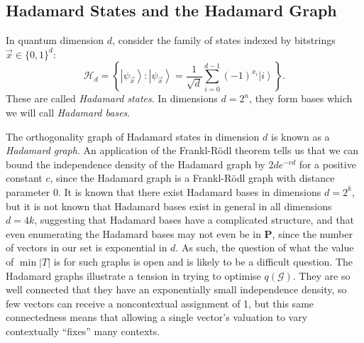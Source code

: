 \documentclass{amsart}
\theoremstyle{definition}
\newcommand{\ket}[1]{{\left\vert{#1}\right\rangle}}
\begin{document}

\subsection{Hadamard States and the Hadamard Graph}

In quantum dimension $d$, consider the family of states indexed by bitstrings $\vec{x}\in\{0,1\}^d$:
\begin{equation}
\mathcal{H}_d=\left\{ \ket{\psi_{\vec{x}}}:\ket{\psi_{\vec{x}}} = \frac{1}{\sqrt{d}}\sum_{i=0}^{d-1}(-1)^{x_i}\ket{i}  \right\}.
\end{equation}
These are called \emph{Hadamard states}. In dimensions $d=2^n$, they form bases which we will call \emph{Hadamard bases}.

The orthogonality graph of Hadamard states in dimension $d$ is known as a \emph{Hadamard graph}. An application of the Frankl-R\"{o}dl theorem \cite{Fran1987} tells us that we can bound the independence density of the Hadamard graph by $2de^{-cd}$ for a positive constant $c$, since the Hadamard graph is a Frankl-R\"{o}dl graph with distance parameter 0. It is known that there exist Hadamard bases in dimensions $d=2^k$, but it is not known that Hadamard bases exist in general in all dimensions $d=4k$, suggesting that Hadamard bases have a complicated structure, and that even enumerating the Hadamard bases may not even be in \textbf{P}, since the number of vectors in our set is exponential in $d$. As such, the question of what the value of $\min|T|$  is for such graphs is open and is likely to be a difficult question. The Hadamard graphs illustrate a tension in trying to optimise $q(\mathcal{G})$. They are so well connected that they have an exponentially small independence density, so few vectors can receive a noncontextual assignment of 1, but this same connectedness means that allowing a single vector's valuation to vary contextually ``fixes'' many contexts.
\end{document}
